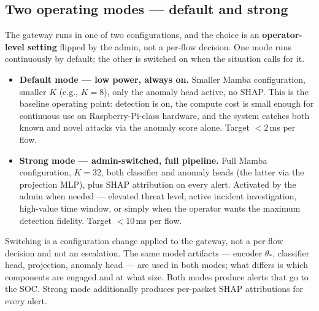 \documentclass[11pt,a4paper]{article}
\begin{document}
\subsection{Two operating modes --- default and strong}
The gateway runs in one of two configurations, and the choice is an \textbf{operator-level setting} flipped by the admin, not a per-flow decision. One mode runs continuously by default; the other is switched on when the situation calls for it.
\begin{itemize}[leftmargin=*, itemsep=2pt]
  \item \textbf{Default mode --- low power, always on.} Smaller Mamba configuration, smaller $K$ (e.g., $K=8$), only the anomaly head active, no SHAP. This is the baseline operating point: detection is on, the compute cost is small enough for continuous use on Raspberry-Pi-class hardware, and the system catches both known and novel attacks via the anomaly score alone. Target $<2$\,ms per flow.
  \item \textbf{Strong mode --- admin-switched, full pipeline.} Full Mamba configuration, $K=32$, both classifier and anomaly heads (the latter via the projection MLP), plus SHAP attribution on every alert. Activated by the admin when needed --- elevated threat level, active incident investigation, high-value time window, or simply when the operator wants the maximum detection fidelity. Target $<10$\,ms per flow.
\end{itemize}
Switching is a configuration change applied to the gateway, not a per-flow decision and not an escalation. The same model artifacts --- encoder $\theta_*$, classifier head, projection, anomaly head --- are used in both modes; what differs is which components are engaged and at what size. Both modes produce alerts that go to the SOC. Strong mode additionally produces per-packet SHAP attributions for every alert.
\end{document}
